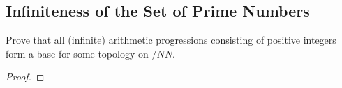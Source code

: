 \subsection{Infiniteness of the Set of Prime Numbers}
\begin{minorEx}%
Prove that all (infinite) arithmetic progressions consisting of positive integers
form a base for some topology on $/NN$.
\end{minorEx}
\begin{proof}
\end{proof}


